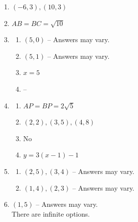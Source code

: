 \documentclass{article}
\begin{document}
\begin{enumerate}
\begin{enumerate}
	\item It is a parallelogram but not a rectangle.
	
	\end{enumerate}
	
\item $(-6, 3), (10, 3)$

\item $AB = BC = \sqrt{10}$

\item

	\begin{enumerate}
	
	\item $(5, 0)$ -- Answers may vary.
	
	\item $(5, 1)$ -- Answers may vary.
	
	\item $x = 5$
	
	\item --
	
	\end{enumerate}
	
\item

	\begin{enumerate}
	
	\item $AP = BP = 2\sqrt{5}$
	
	\item $(2, 2), (3, 5), (4, 8)$
	
	\item No
	
	\item $y = 3(x - 1) - 1$
	
	\end{enumerate}
	
\item

	\begin{enumerate}
	
	\item $(2, 5), (3, 4)$ -- Answers may vary.
	
	\item $(1, 4), (2, 3)$ -- Answers may vary.
	
	\end{enumerate}
	
\item $(1, 5)$ -- Answers may vary. \\ There are infinite options.


\end{enumerate}
\end{document}
